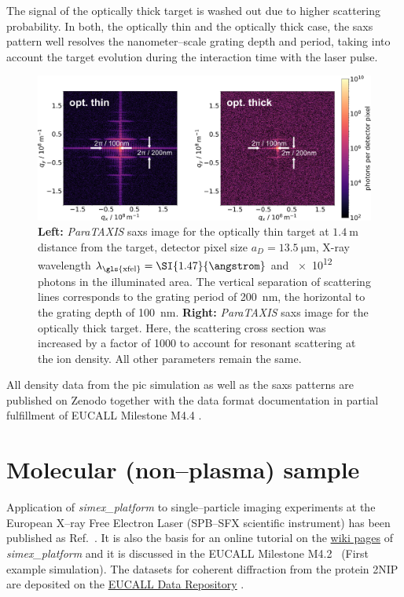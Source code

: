 \documentclass[10pt]{scrartcl}
\begin{document}
The signal of the optically thick target is washed out due to
higher scattering probability. In both, the optically thin and the optically
thick case, the
\gls{saxs} pattern well resolves the nanometer--scale grating depth and period, taking
into account the target evolution during the interaction time with the laser
pulse.
%
\begin{figure}[ht]
  \centering
  \includegraphics[width=.99\linewidth]{figures/scattering_images_v2.png}
  \caption{
    \textbf{Left:} \textit{ParaTAXIS} \gls{saxs} image for the optically thin target at
    $\SI{1.4}{\metre}$ distance from the target, detector pixel size $a_D =
    \SI{13.5}{\micro\metre}$, X-ray wavelength $\lambda_\mathrm{\gls{xfel}} =
    \SI{1.47}{\angstrom}$ and
    \num{e12} photons in the illuminated area. The vertical separation of scattering
    lines corresponds to the grating period of \SI{200}{\nano\metre}, the horizontal to
    the grating depth of \SI{100}{\nano\metre}.
    \textbf{Right:} \textit{ParaTAXIS} \gls{saxs} image for the optically thick target. Here, the
    scattering cross section was increased by a factor of \num{1000} to account for
  resonant scattering at the ion density. All other parameters remain the same.  }
  \label{fig:scattering}
\end{figure}

All density data from the \gls{pic} simulation as well as the \gls{saxs} patterns are
published on Zenodo together with the data format documentation
\cite{Garten2017.zenodo.885033} in partial fulfillment of EUCALL Milestone M4.4
\cite{EUCALL_SIMEX_M4.4}.

\section{Molecular (non--plasma) sample}
Application of \textit{simex\_platform} to single--particle imaging experiments
at the European X--ray Free Electron Laser (SPB--SFX scientific instrument) has
been published as Ref.~\cite{Fortmann-Grote2017}. It is also the basis for an
online tutorial on the
\href{https://www.github.com/eucall-software/simex_platform/wiki/SimEx-Tutorial}{wiki
pages} of \textit{simex\_platform} and it is
discussed in the EUCALL Milestone M4.2~\cite{EUCALL_SIMEX_M4.2} (First example
simulation).
The datasets for coherent diffraction from the protein 2NIP are deposited on
the \href{https://www.zenodo.org/communities/eucall-data}{EUCALL Data
Repository} \cite{Fortmann-Grote2017.zenodo.886087}.
\end{document}
